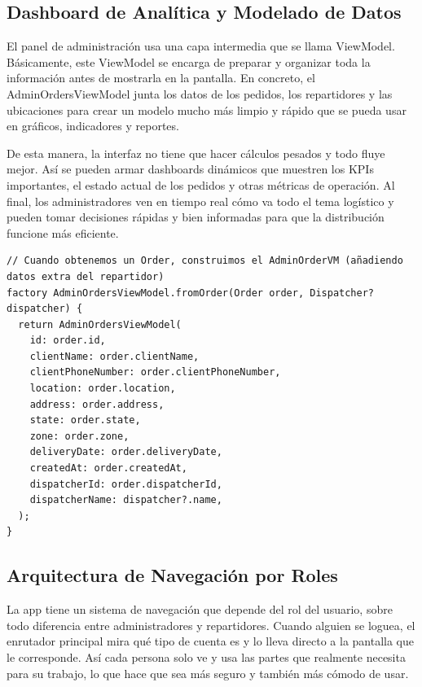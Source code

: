 \subsection{Dashboard de Analítica y Modelado de Datos}
El panel de administración usa una capa intermedia que se llama ViewModel. Básicamente, este ViewModel se encarga de preparar y organizar toda la información antes de mostrarla en la pantalla. En concreto, el AdminOrdersViewModel junta los datos de los pedidos, los repartidores y las ubicaciones para crear un modelo mucho más limpio y rápido que se pueda usar en gráficos, indicadores y reportes.

De esta manera, la interfaz no tiene que hacer cálculos pesados y todo fluye mejor. Así se pueden armar dashboards dinámicos que muestren los KPIs importantes, el estado actual de los pedidos y otras métricas de operación. Al final, los administradores ven en tiempo real cómo va todo el tema logístico y pueden tomar decisiones rápidas y bien informadas para que la distribución funcione más eficiente.
\begin{lstlisting}
// Cuando obtenemos un Order, construimos el AdminOrderVM (añadiendo datos extra del repartidor)
factory AdminOrdersViewModel.fromOrder(Order order, Dispatcher? dispatcher) {
  return AdminOrdersViewModel(
    id: order.id,
    clientName: order.clientName,
    clientPhoneNumber: order.clientPhoneNumber,
    location: order.location,
    address: order.address,
    state: order.state,
    zone: order.zone,
    deliveryDate: order.deliveryDate,
    createdAt: order.createdAt,
    dispatcherId: order.dispatcherId,
    dispatcherName: dispatcher?.name,
  );
}
\end{lstlisting}

\subsection{Arquitectura de Navegación por Roles}
La app tiene un sistema de navegación que depende del rol del usuario, sobre todo diferencia entre administradores y repartidores. Cuando alguien se loguea, el enrutador principal mira qué tipo de cuenta es y lo lleva directo a la pantalla que le corresponde. Así cada persona solo ve y usa las partes que realmente necesita para su trabajo, lo que hace que sea más seguro y también más cómodo de usar.

